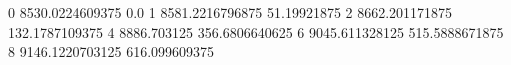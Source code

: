 0 8530.0224609375 0.0
1 8581.2216796875 51.19921875
2 8662.201171875 132.1787109375
4 8886.703125 356.6806640625
6 9045.611328125 515.5888671875
8 9146.1220703125 616.099609375

